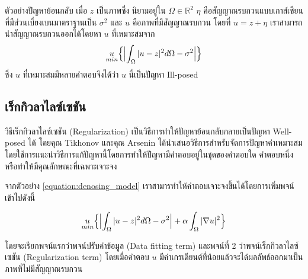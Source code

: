 \begin{Example}
    ตัวอย่างปัญหาย้อนกลับ เมื่อ $z$ เป็นภาพซึ่ง นิยามอยู่ใน $ \Omega \in \mathbb{R}^2$ $\eta$ คือสัญญาณรบกวนแบบเกาส์เซียนที่มีส่วนเบี่ยงเบนมาตราฐานเป็น $\sigma^2$ และ $u$ คือภาพที่มีสัญญาณรบกวน โดยที่ $u = z + \eta$ เราสามารถนำสัญญาณรบกวนออกได้โดยหา $u$ ที่เหมาะสมจาก
    \begin{align}
        \underset{min}{u} \Big\{ \Bigl| \int_{\Omega} |u-z|^2 d\Omega - \sigma^2 \Bigr| \Big\}
        \label{equation:denosing_model}
    \end{align}
    ซึ่ง $u$ ที่เหมาะสมมีหลายคำตอบจึงได้ว่า $u$ นี่เป็นปัญหา Ill-posed
\end{Example}


\subsection{เร็กกิวลาไลซ์เซชัน}
\hspace{1cm} วิธีเร็กกิวลาไลซ์เซชัน (Regularization) เป็นวิธีการทำให้ปัญหาย้อนกลับกลายเป็นปัญหา Well-posed ได้ โดยคุณ Tikhonov และคุณ Arsenin \cite{ref:regularization} ได้นำเสนอวิธีการสำหรับจัดการปัญหาค่าเหมาะสมโดยใช้การแนะนำวิธีการแก้ปัญหานี้โดยการทำให้ปัญหามีคำตอบอยู่ในชุดของคำตอบใด คำตอบหนึ่ง หรือทำให้มีคุณลักษณะที่เฉพาะเจาะจง

\hspace{1cm} จากตัวอย่าง \ref{equation:denosing_model} เราสามารทำให้คำตอบเจาะจงขึ้นได้โดยการเพิ่มพจน์เข้าไปดังนี้

\begin{align}
    \underset{min}{u} \Big\{ \Bigl| \int_{\Omega} |u-z|^2 d\Omega - \sigma^2 \Bigr| + \alpha \int_{\Omega} |\nabla u|^2 \Big\}
    \label{equation:denosing_reglarization_model}
\end{align}

\hspace{1cm} โดยจะเรียกพจน์แรกว่าพจน์ปรับค่าข้อมูล (Data fitting term) และพจน์ที่ 2 ว่าพจน์เร็กกิวลาไลซ์เซชัน (Regularization term) โดยเมื่อคำตอบ $u$ มีค่าเกรเดียนต์ที่น้อยแล้วจะได้ผลลัพธ์ออกมาเป็นภาพที่ไม่มีสัญญาณรบกวน